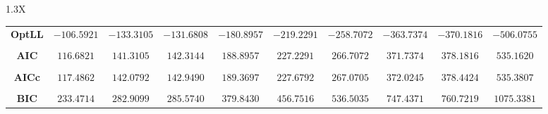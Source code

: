 \documentclass[10pt]{article}
\begin{document}
{\begin{tabularx}{1.3\textwidth}{X}
{\begin{tabular}{cccccccccc}
\cmidrule(r){1-10} \\
 { {\bf OptLL} }& $-106.5921$ & $-133.3105$ & $-131.6808$ & $-180.8957$ & $-219.2291$ & $-258.7072$ & $-363.7374$& $-370.1816$& $-506.0755$ \\
\cmidrule(r){1-10} \\
 { {\bf AIC} }& $116.6821$ & $141.3105$ & $142.3144$ & $188.8957$ & $227.2291$ & $266.7072$ & $371.7374$& $378.1816$& $535.1620$ \\
\cmidrule(r){1-10} \\
 { {\bf AICc} }& $117.4862$ & $142.0792$ & $142.9490$ & $189.3697$ & $227.6792$ & $267.0705$ & $372.0245$& $378.4424$& $535.3807$ \\
\cmidrule(r){1-10} \\
 { {\bf BIC} }& $233.4714$ & $282.9099$ & $285.5740$ & $379.8430$ & $456.7516$ & $536.5035$ & $747.4371$& $760.7219$& $1075.3381$ \\
\bottomrule
\end{tabular}}
\end{tabularx}}

  \vspace{3 cm}

  
\end{document}
